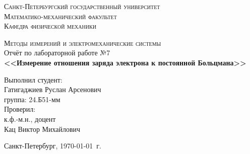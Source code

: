 \begin{titlepage}
\begin{center}
\textsc{Санкт-Петербургский государственный университет\\
Математико-механический факультет\\
Кафедра физической механики\\}

\vfill

\textsc{Методы измерений и электромеханические системы\\[3mm]}
Отчёт по лабораторной работе №7\\[6mm]


\textbf{\large<<Измерение отношения заряда электрона к постоянной Больцмана>>}

\vfill
\end{center}

\hfill
\begin{minipage}{.5\textwidth}
Выполнил студент:\\[2mm] 
Гатигаджиев Руслан Арсенович\\
группа: 24.Б51-мм\\[5mm]

Проверил:\\[2mm] 
к.ф.-м.н., доцент\\
Кац Виктор Михайлович
\end{minipage}%
\vfill
\begin{center}
 Санкт-Петербург, \yeardate\today\ г.
\end{center}
\end{titlepage}